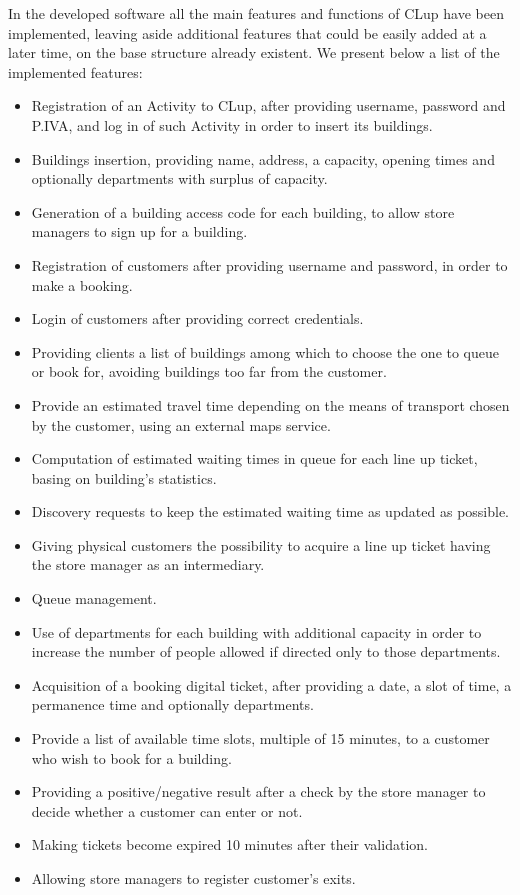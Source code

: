 \renewcommand{\thesubsection}{\Alph{subsection}}
In the developed software all the main features and functions of CLup have been implemented, leaving aside additional features that could be easily added at a later time, on the base structure already existent.
We present below a list of the implemented features:
\begin{itemize}
	\item Registration of an Activity to CLup, after providing username, password and P.IVA, and log in of such Activity in order to insert its buildings.
	\item Buildings insertion, providing name, address, a capacity, opening times and optionally departments with surplus of capacity.
	\item Generation of a building access code for each building, to allow store managers to sign up for a building.
	\item Registration of customers after providing username and password, in order to make a booking.
	\item Login of customers after providing correct credentials.
	\item Providing clients a list of buildings among which to choose the one to queue or book for, avoiding buildings too far from the customer.
	\item Provide an estimated travel time depending on the means of transport chosen by the customer, using an external maps service.
	\item Computation of estimated waiting times in queue for each line up ticket, basing on building's statistics.
	\item Discovery requests to keep the estimated waiting time as updated as possible.
	\item Giving physical customers the possibility to acquire a line up ticket having the store manager as an intermediary.
	\item Queue management.
	\item Use of departments for each building with additional capacity in order to increase the number of people allowed if directed only to those departments.
	\item Acquisition of a booking digital ticket, after providing a date, a slot of time, a permanence time and optionally departments.
	\item Provide a list of available time slots, multiple of 15 minutes, to a customer who wish to book for a building.
	\item Providing a positive/negative result after a check by the store manager to decide whether a customer can enter or not.
	\item Making tickets become expired 10 minutes after their validation.
	\item Allowing store managers to register customer's exits.
\end{itemize}
